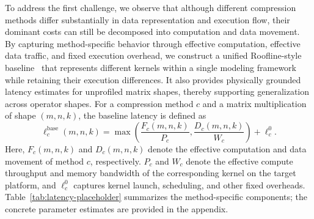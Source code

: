 \documentclass[letterpaper]{article} %
\begin{document}
To address the first challenge, we observe that although different compression methods differ substantially in data representation and execution flow, their dominant costs can still be decomposed into computation and data movement. By capturing method-specific behavior through effective computation, effective data traffic, and fixed execution overhead, we construct a unified Roofline-style baseline~\cite{williams2009roofline} that represents different kernels within a single modeling framework while retaining their execution differences. It also provides physically grounded latency estimates for unprofiled matrix shapes, thereby supporting generalization across operator shapes. For a compression method $c$ and a matrix multiplication of shape $(m,n,k)$, the baseline latency is defined as
\begin{equation}
\ell_{c}^{\mathrm{base}}(m,n,k)
=
\max
\left(
\frac{F_c(m,n,k)}{P_c},
\frac{D_c(m,n,k)}{W_c}
\right)
+
\ell_c^{0}.
\end{equation}
Here, $F_c(m,n,k)$ and $D_c(m,n,k)$ denote the effective computation and data movement of method $c$, respectively. $P_c$ and $W_c$ denote the effective compute throughput and memory bandwidth of the corresponding kernel on the target platform, and $\ell_c^{0}$ captures kernel launch, scheduling, and other fixed overheads. Table~\ref{tab:latency-placeholder} summarizes the method-specific components; the concrete parameter estimates are provided in the appendix.
\end{document}
